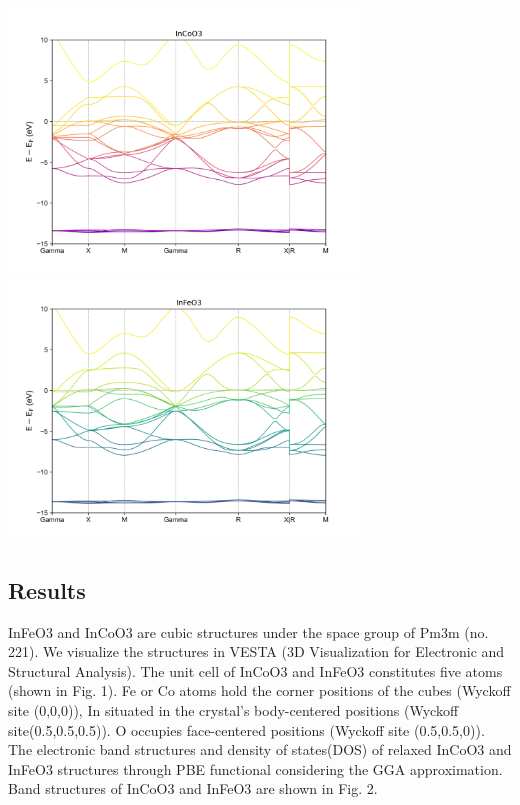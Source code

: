 \documentclass[12pt, letterpaper]{article}
\newcommand*{\1}{\hspace{1pt}}
\begin{document}
    \begin{adjustbox}{center,caption={Band Structure Of InCoO3 and InFeO3},label={somelabel},nofloat=figure,vspace=\bigskipamount}
        \includegraphics[width=0.7\textwidth]{bandCo}
        \includegraphics[width=0.7\textwidth]{bandFe}
    \end{adjustbox}

    \subsection*{Results}
    InFeO3 and InCoO3 are cubic structures under the space group of Pm3m (no. 221). We visualize the structures in VESTA (3D Visualization for Electronic and 
    Structural Analysis). The unit cell of InCoO3 and InFeO3 constitutes five atoms (shown in Fig. 1). Fe or Co atoms hold the corner positions of the cubes (Wyckoff 
    site (0,0,0)), In situated in the crystal's body-centered positions (Wyckoff site(0.5,0.5,0.5)). O occupies face-centered positions (Wyckoff site (0.5,0.5,0)). 
    The electronic band structures and density of states(DOS) of relaxed InCoO3 and InFeO3 structures through PBE functional considering the GGA approximation. 
    Band structures of InCoO3 and InFeO3 are shown in Fig. 2.  
\end{document}
